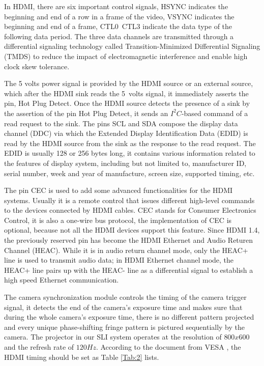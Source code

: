 \documentclass[]{spie}  %
\begin{document}
In HDMI, there are six important control signals, HSYNC indicates the beginning and end of a row in a frame of the video, VSYNC indicates the beginning and end of a frame, CTL0~CTL3 indicate the data type of the following data period. The three data channels are transmitted through a differential signaling technology called Transition-Minimized Differential Signaling (TMDS) to reduce the impact of electromagnetic interference and enable high clock skew tolerance. %

The 5 volts power signal is provided by the HDMI source or an external source, which after the HDMI sink reads the 5~volts signal, it immediately asserts the pin, Hot Plug Detect. Once the HDMI source detects the presence of a sink by the assertion of the pin Hot Plug Detect, it sends an $I^2C$-based command of a read request to the sink. The pins SCL and SDA compose the display data channel (DDC) via which the Extended Display Identification Data (EDID) is read by the HDMI source from the sink as the response to the read request. The EDID is usually 128 or 256 bytes long, it contains various information related to the features of display system, including but not limited to, manufacturer ID, serial number, week and year of manufacture, screen size, supported timing, etc.

The pin CEC is used to add some advanced functionalities for the HDMI systems. Usually it is a remote control that issues different high-level commands to the devices connected by HDMI cables. CEC stands for Consumer Electronics Control, it is also a one-wire bus protocol, the implementation of CEC is optional, because not all the HDMI devices support this feature. Since HDMI 1.4, the previously reserved pin has become the HDMI Ethernet and Audio Returen Channel (HEAC). While it is in audio return channel mode, only the HEAC+ line is used to transmit audio data; in HDMI Ethernet channel mode, the HEAC+ line pairs up with the HEAC- line as a differential signal to establish a high speed Ethernet communication.

The camera synchronization module controls the timing of the camera trigger signal, it detects the end of the camera's exposure time and makes sure that during the whole camera's exposure time, there is no different pattern projected and every unique phase-shifting fringe pattern is pictured sequentially by the camera. The projector in our SLI system operates at the resolution of $800x600$ and the refresh rate of $120 Hz$. According to the document from VESA \cite{vesa07}, the HDMI timing should be set as Table \ref{Tab:2} lists.
\end{document}
